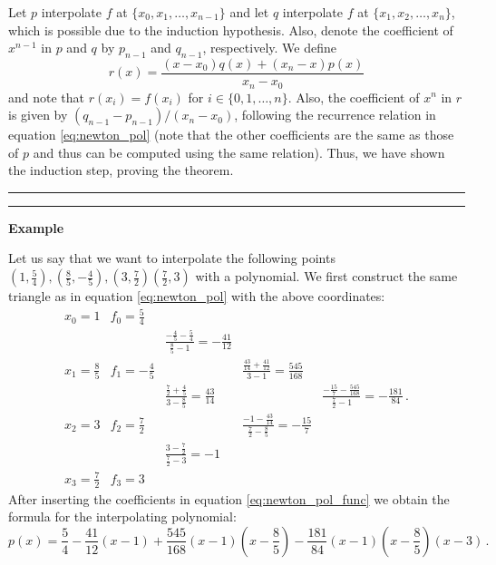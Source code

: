 \begin{tcolorbox}[enhanced, size=fbox, shadow={2mm}{-2mm}{0mm}{gray!30!white}, boxrule={1.5pt}, colback=white, sharp corners, breakable, boxsep=5pt, left=2pt, right=2pt, title=\Large{Newton Polynomials}]
    Let $p$ interpolate $f$ at $\{ x_0, x_1, \dots, x_{n-1} \}$ and let $q$ interpolate $f$ at $\{ x_1, x_2, \dots, x_{n}\}$, which is possible due to the induction hypothesis. Also, denote the coefficient of $x^{n-1}$ in $p$ and $q$ by $p_{n-1}$ and $q_{n-1}$, respectively.
    We define
    \begin{equation}
        r(x) = \frac{(x-x_0)q(x) + (x_{n}-x)p(x)}{x_{n}-x_0} \nonumber
    \end{equation}
    and note that $r(x_i) = f(x_i)$ for $i \in \{ 0, 1, \dots, n \}$. Also, the coefficient of $x^{n}$ in $r$ is given by $(q_{n-1} - p_{n-1})/{(x_{n}-x_0)}$, following the recurrence relation in equation \ref{eq:newton_pol} (note that the other coefficients are the same as those of $p$ and thus can be computed using the same relation). Thus, we have shown the induction step, proving the theorem.

    \vspace{.5em}
    \hrule
    \hrule
    \vspace{.5em}

    \textbf{\Large{Example}}

    Let us say that we want to interpolate the following points $(1, \frac{5}{4}), (\frac{8}{5}, -\frac{4}{5}), (3, \frac{7}{2}) (\frac{7}{2}, 3)$ with a polynomial.
    We first construct the same triangle as in equation \ref{eq:newton_pol} with the above coordinates:
    \begin{equation}
        \begin{matrix}
            x_0 = 1 & f_0 = \frac{5}{4} \\
                & & \frac{-\frac{4}{5}-\frac{5}{4}}{\frac{8}{5}-1} = -\frac{41}{12} \\
            x_1 = \frac{8}{5} & f_1 = -\frac{4}{5} & & \frac{\frac{43}{14} + \frac{41}{12}}{3-1} = \frac{545}{168} \\
                & & \frac{\frac{7}{2}+\frac{4}{5}}{3-\frac{8}{5}} = \frac{43}{14} & & \frac{-\frac{15}{7} - \frac{545}{168}}{\frac{7}{2}-1} = -\frac{181}{84} \,. \\
            x_2 = 3 & f_2 = \frac{7}{2} & & \frac{-1 - \frac{43}{14}}{\frac{7}{2}-\frac{8}{5}} = -\frac{15}{7} \\
                   &        & \frac{3-\frac{7}{2}}{\frac{7}{2}-3} = -1 \\
            x_3 = \frac{7}{2} & f_3 = 3
        \end{matrix}
        \nonumber
    \end{equation}
    After inserting the coefficients in equation \ref{eq:newton_pol_func} we obtain the formula for the interpolating polynomial:
    \begin{equation}
        p(x) = \frac{5}{4} - \frac{41}{12} (x-1) + \frac{545}{168} (x-1)(x-\frac{8}{5}) - \frac{181}{84} (x-1)(x-\frac{8}{5})(x-3) \,. \label{eq:newton_pol_fun_values}
    \end{equation}


\end{tcolorbox}
